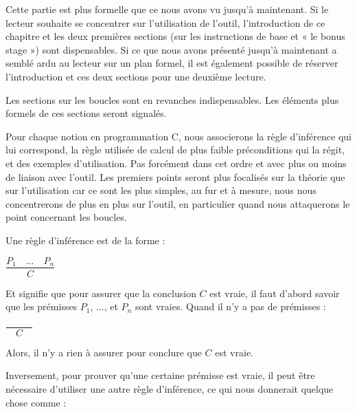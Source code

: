 

\begin{Information}
Cette partie est plus formelle que ce nous avons vu jusqu'à maintenant. Si le 
lecteur souhaite se concentrer sur l'utilisation de l'outil, l'introduction de
ce chapitre et les deux premières sections (sur les instructions de base et « le 
bonus stage ») sont dispensables. Si ce que nous avons présenté jusqu'à maintenant
a semblé ardu au lecteur sur un plan formel, il est également possible de réserver 
l'introduction et ces deux sections pour une deuxième lecture.

Les sections sur les boucles sont en revanches indispensables. Les éléments plus
formels de ces sections seront signalés.
\end{Information}


Pour chaque notion en programmation C, nous associerons la règle d'inférence qui 
lui correspond, la règle utilisée de calcul de plus faible préconditions qui la 
régit, et des exemples d'utilisation. Pas forcément dans cet ordre et avec plus ou 
moins de liaison avec l'outil. Les premiers points seront plus focalisés sur la
théorie que sur l'utilisation car ce sont les plus simples, au fur et à mesure,
nous nous concentrerons de plus en plus sur l'outil, en particulier quand nous 
attaquerons le point concernant les boucles.





Une règle d'inférence est de la forme :




\begin{center}
$\dfrac{P_1 \quad ... \quad P_n}{C}$


\end{center}


Et signifie que pour assurer que la conclusion $C$ est vraie, il faut d'abord
savoir que les prémisses $P_1$, ..., et $P_n$ sont vraies. Quand il n'y a
pas de prémisses :




\begin{center}
$\dfrac{}{\quad C \quad}$


\end{center}


Alors, il n'y a rien à assurer pour conclure que $C$ est vraie.



Inversement, pour prouver qu'une certaine prémisse est vraie, il peut être nécessaire 
d'utiliser une autre règle d'inférence, ce qui nous donnerait quelque
chose comme :





